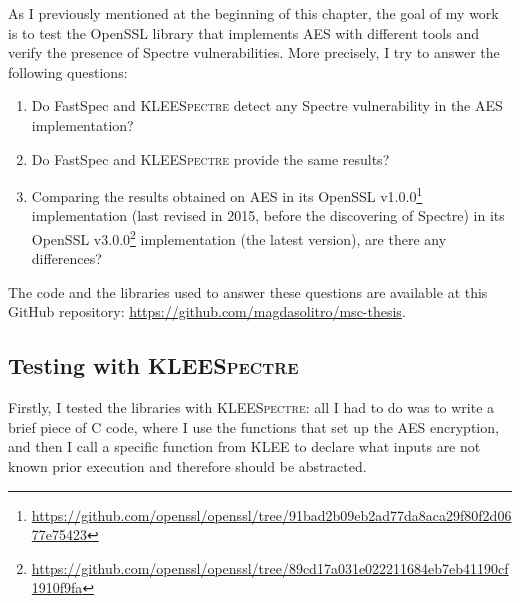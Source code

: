 \documentclass[12pt,a4paper]{book}
\theoremstyle{definition}
\begin{document}
	As I previously mentioned at the beginning of this chapter, the goal of my work is to test the OpenSSL library that implements AES with different tools and verify the presence of Spectre vulnerabilities. More precisely, I try to answer the following questions:
	\begin{enumerate}
		\item Do FastSpec and \textsc{KLEESpectre} detect any Spectre vulnerability in the AES implementation?
		\item Do FastSpec and \textsc{KLEESpectre} provide the same results?
		\item Comparing the results obtained on AES in its OpenSSL v1.0.0\footnote{\url{https://github.com/openssl/openssl/tree/91bad2b09eb2ad77da8aca29f80f2d0677e75423}} implementation (last revised in 2015, before the discovering of Spectre) in its OpenSSL v3.0.0\footnote{\url{https://github.com/openssl/openssl/tree/89cd17a031e022211684eb7eb41190cf1910f9fa}} implementation (the latest version), are there any differences? 
	\end{enumerate}
	The code and the libraries used to answer these questions are available at this GitHub repository: \url{https://github.com/magdasolitro/msc-thesis}.
	\subsection{Testing with \textsc{KLEESpectre}}
	Firstly, I tested the libraries with \textsc{\textsc{\textsc{KLEESpectre}}}: all I had to do was to write a brief piece of C code, where I use the functions that set up the AES encryption, and then I call a specific function from \textsc{KLEE} to declare what inputs are not known prior execution and therefore should be abstracted.
	
\end{document}
